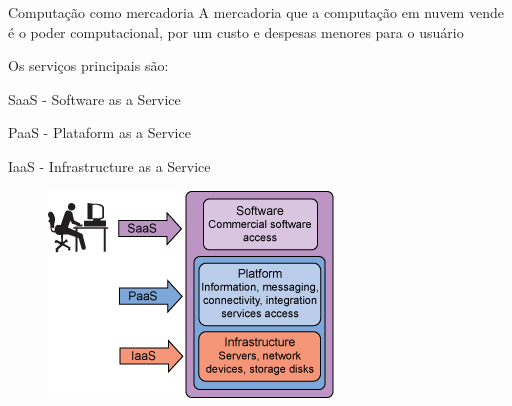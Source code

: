 \begin{frame}{Computação como mercadoria}
    A mercadoria que a computação em nuvem vende é o poder computacional, por um
    custo e despesas menores para o usuário

    Os serviços principais são:
    \begin{itemise}
        \item<2-> SaaS - Software as a Service 
        \item<3-> PaaS - Plataform as a Service
        \item<4-> IaaS - Infrastructure as a Service
    \end{itemise}
    
    \begin{figure}
        \includegraphics[scale=0.5]{image/layers.png}
    \end{figure}

\end{frame}
